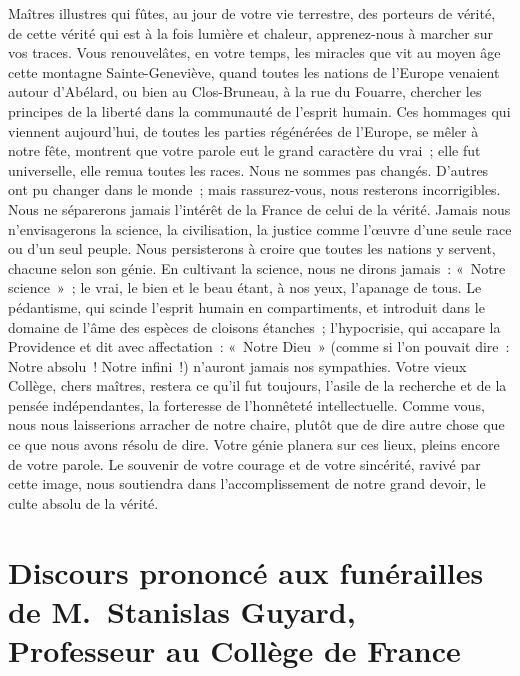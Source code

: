 \documentclass[french,twoside]{book} %
\newcommand\orgName[1]{#1}
\newcommand\persName[1]{#1}
\newcommand\placeName[1]{#1}
\begin{document}
Maîtres illustres qui fûtes, au jour de votre vie terrestre, des porteurs de vérité, de cette vérité qui est à la fois lumière et chaleur, apprenez-nous à marcher sur vos traces. Vous renouvelâtes, en votre temps, les miracles que vit au moyen âge cette {\placeName montagne Sainte-Geneviève}, quand toutes les nations de l’{\placeName Europe} venaient autour d’{\persName Abélard}, ou bien au {\placeName Clos-Bruneau}, à la {\placeName rue du Fouarre}, chercher les principes de la liberté dans la communauté de l’esprit humain. Ces hommages qui viennent aujourd’hui, de toutes les parties régénérées de l’{\placeName Europe}, se mêler à notre fête, montrent que votre parole eut le grand caractère du vrai ; elle fut universelle, elle remua toutes les races. Nous ne sommes pas changés. D’autres ont pu changer dans le monde ; mais rassurez-vous, nous resterons incorrigibles. Nous ne séparerons jamais l’intérêt de la {\orgName France} de celui de la vérité. Jamais nous n’envisagerons la science, la civilisation, la justice comme l’œuvre d’une seule race ou d’un seul peuple. Nous persisterons à croire que toutes les nations y servent, chacune selon son génie. En cultivant la science, nous ne dirons jamais : « Notre science » ; le vrai, le bien et le beau étant, à nos yeux, l’apanage de tous. Le pédantisme, qui scinde l’esprit humain en compartiments, et introduit dans le domaine de l’âme des espèces de cloisons étanches ; l’hypocrisie, qui accapare la Providence et dit avec affectation : « Notre Dieu » (comme si l’on pouvait dire : Notre absolu ! Notre infini !) n’auront jamais nos sympathies. Votre vieux {\orgName Collège}, chers maîtres, restera ce qu’il fut toujours, l’asile de la recherche et de la pensée indépendantes, la forteresse de l’honnêteté intellectuelle. Comme vous, nous nous laisserions arracher de notre chaire, plutôt que de dire autre chose que ce que nous avons résolu de dire. Votre génie planera sur ces lieux, pleins encore de votre parole. Le souvenir de votre courage et de votre sincérité, ravivé par cette image, nous soutiendra dans l’accomplissement de notre grand devoir, le culte absolu de la vérité.
\section[{Discours prononcé aux funérailles de M. Stanislas Guyard, Professeur au Collège de France}]{Discours prononcé aux funérailles de {\persName M. Stanislas Guyard}, \\
Professeur au {\orgName Collège de France}}\renewcommand{\leftmark}{Discours prononcé aux funérailles de {\persName M. Stanislas Guyard}, \\
Professeur au {\orgName Collège de France}}
\end{document}
